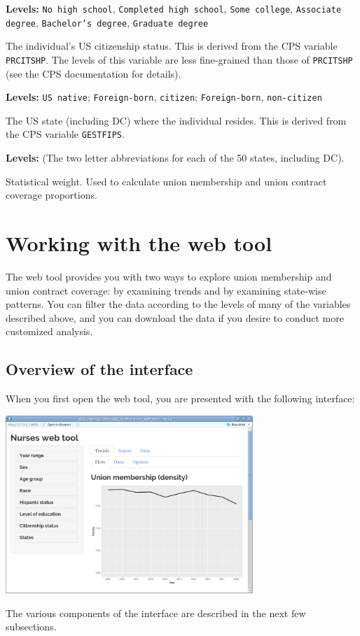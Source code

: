 \documentclass[letterpaper,12pt]{article}
\begin{document}
\begin{description}[style=multiline,leftmargin=3cm,font=\normalfont]
  \textbf{Levels:} \texttt{No high school}, \texttt{Completed high
    school}, \texttt{Some college}, \texttt{Associate degree},
  \texttt{Bachelor's degree}, \texttt{Graduate degree}

\item[\texttt{citizen}] The individual's US citizenship status. This
  is derived from the CPS variable \texttt{PRCITSHP}. The levels of
  this variable are less fine-grained than those of \texttt{PRCITSHP}
  (see the CPS documentation for details).

  \textbf{Levels:} \texttt{US native}; \texttt{Foreign-born},
  \texttt{citizen}; \texttt{Foreign-born}, \texttt{non-citizen}

\item[\texttt{state}] The US state (including DC) where the individual
  resides. This is derived from the CPS variable \texttt{GESTFIPS}.

  \textbf{Levels:} (The two letter abbreviations for each of the 50
  states, including DC).

\item[\texttt{weight}] Statistical weight. Used to calculate union
  membership and union contract coverage proportions.

\end{description}

\section{Working with the web tool}

The web tool provides you with two ways to explore union membership
and union contract coverage: by examining trends and by examining
state-wise patterns. You can filter the data according to the levels
of many of the variables described above, and you can download the
data if you desire to conduct more customized analysis.

\subsection{Overview of the interface}

When you first open the web tool, you are presented with the following
interface:
\begin{center}
  \includegraphics[width=0.7\textwidth]{images/opening_interface.png}
\end{center}
The various components of the interface are described in the next few
subsections.
\end{document}
